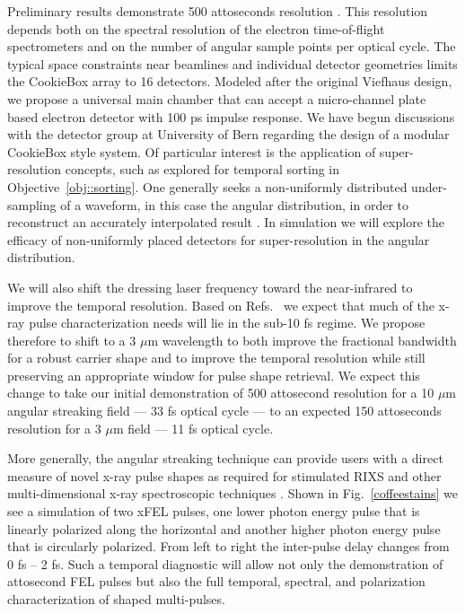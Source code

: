 Preliminary results demonstrate 500 attoseconds resolution \cite{Nick2016}.
This resolution depends both on the spectral resolution of the electron time-of-flight spectrometers and on the number of angular sample points per optical cycle.
The typical space constraints near beamlines and individual detector geometries limits the CookieBox array to 16 detectors. %
Modeled after the original Viefhaus design, we propose a universal main chamber that can accept a micro-channel plate based electron detector with 100 ps impulse response.
We have begun discussions with the detector group at University of Bern regarding the design of a modular CookieBox style system.
Of particular interest is the application of super-resolution concepts, such as explored for temporal sorting in Objective~\ref{obj::sorting}.
One generally seeks a non-uniformly distributed under-sampling of a waveform, in this case the angular distribution, in order to reconstruct an accurately interpolated result \cite{Candes2004a,Candes2004b,Candes2005,Elad2006}. 
In simulation we will explore the efficacy of non-uniformly placed detectors for super-resolution in the angular distribution.

We will also shift the dressing laser frequency toward the near-infrared to improve the temporal resolution.
Based on Refs.~\cite{lcls2_opportunities,Biggs2012,Mukamel2013} we expect that much of the x-ray pulse characterization needs will lie in the sub-10 fs regime.
We propose therefore to shift to a 3 $\mu$m wavelength to both improve the fractional bandwidth for a robust carrier shape and to improve the temporal resolution while still preserving an appropriate window for pulse shape retrieval.
We expect this change to take our initial demonstration of 500 attosecond resolution for a 10 $\mu$m angular streaking field --- 33 fs optical cycle --- to an expected 150 attoseconds resolution for a 3 $\mu$m field --- 11 fs optical cycle.

More generally, the angular streaking technique can provide users with a direct measure of novel x-ray pulse shapes as required for stimulated RIXS and other multi-dimensional x-ray spectroscopic techniques \cite{Biggs2012,Mukamel2013,4WaveMixing}.
Shown in Fig.~\ref{coffeestains} we see a simulation of two xFEL pulses, one lower photon energy pulse that is linearly polarized along the horizontal and another higher photon energy pulse that is circularly polarized.
From left to right the inter-pulse delay changes from 0 fs -- 2 fs.
Such a temporal diagnostic will allow not only the demonstration of attosecond FEL pulses but also the full temporal, spectral, and polarization characterization of shaped multi-pulses.


